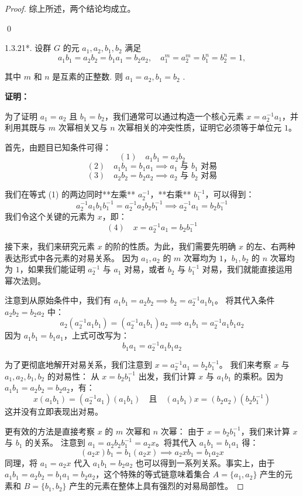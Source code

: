 \documentclass[]{article}
\begin{document}
\begin{proof}
\bigskip
综上所述，两个结论均成立。

\qed

1.3.21*. 设群 $G$ 的元 $a_1, a_2, b_1, b_2$ 满足 $$
a _ {1} b _ {1} = a _ {2} b _ {2} = b _ {1} a _ {1} = b _ {2} a _ {2}, \quad a _ {1} ^ {m} = a _ {2} ^ {m} = b _ {1} ^ {n} = b _ {2} ^ {n} = 1,
$$

其中 $m$ 和 $n$ 是互素的正整数. 则 $a_1 = a_2, b_1 = b_2$ . 

\bigskip
\noindent \textbf{证明：} 

为了证明 $a_1 = a_2$ 且 $b_1 = b_2$，我们通常可以通过构造一个核心元素 $x = a_2^{-1}a_1$，并利用其既与 $m$ 次幂相关又与 $n$ 次幂相关的冲突性质，证明它必须等于单位元 $1$。

首先，由题目已知条件可得：
\[ (1) \quad a_{1} b_{1} = a_{2} b_{2} \]
\[ (2) \quad a_{1} b_{1} = b_{1} a_{1} \implies a_1 \text{ 与 } b_1 \text{ 对易} \]
\[ (3) \quad a_{2} b_{2} = b_{2} a_{2} \implies a_2 \text{ 与 } b_2 \text{ 对易} \]

我们在等式 (1) 的两边同时**左乘** $a_2^{-1}$，**右乘** $b_1^{-1}$，可以得到：
\[ a_2^{-1} a_1 b_1 b_1^{-1} = a_2^{-1} a_2 b_2 b_1^{-1} \implies a_2^{-1} a_1 = b_2 b_1^{-1} \]
我们令这个关键的元素为 $x$，即：
\[ (4) \quad x = a_2^{-1} a_1 = b_2 b_1^{-1} \]

接下来，我们来研究元素 $x$ 的阶的性质。为此，我们需要先明确 $x$ 的左、右两种表达形式中各元素的对易关系。
因为 $a_1, a_2$ 的 $m$ 次幂均为 $1$，$b_1, b_2$ 的 $n$ 次幂均为 $1$，如果我们能证明 $a_2^{-1}$ 与 $a_1$ 对易，或者 $b_2$ 与 $b_1^{-1}$ 对易，我们就能直接运用幂次法则。

注意到从原始条件中，我们有 $a_1 b_1 = a_2 b_2 \implies b_2 = a_2^{-1} a_1 b_1$。
将其代入条件 $a_2 b_2 = b_2 a_2$ 中：
\[ a_2 (a_2^{-1} a_1 b_1) = (a_2^{-1} a_1 b_1) a_2 \implies a_1 b_1 = a_2^{-1} a_1 b_1 a_2 \]
因为 $a_1 b_1 = b_1 a_1$，上式可改写为：
\[ b_1 a_1 = a_2^{-1} a_1 b_1 a_2 \]

为了更彻底地解开对易关系，我们注意到 $x = a_2^{-1}a_1 = b_2 b_1^{-1}$。
我们来考察 $x$ 与 $a_1, a_2, b_1, b_2$ 的对易性：
从 $x = b_2 b_1^{-1}$ 出发，我们计算 $x$ 与 $a_1 b_1$ 的乘积。因为 $a_1 b_1 = a_2 b_2 = b_2 a_2$，有：
\[ x (a_1 b_1) = (a_2^{-1} a_1) (a_1 b_1) \quad \text{且} \quad (a_1 b_1) x = (b_2 a_2) (b_2 b_1^{-1}) \]
这并没有立即表现出对易。

更有效的方法是直接考察 $x$ 的 $m$ 次幂和 $n$ 次幂：
由于 $x = b_2 b_1^{-1}$，我们来计算 $x$ 与 $b_1$ 的关系。
注意到 $a_1 = a_2 b_2 b_1^{-1} = a_2 x$。将其代入 $a_1 b_1 = b_1 a_1$ 得：
\[ (a_2 x) b_1 = b_1 (a_2 x) \implies a_2 x b_1 = b_1 a_2 x \]
同理，将 $a_1 = a_2 x$ 代入 $a_1 b_1 = b_2 a_2$ 也可以得到一系列关系。事实上，由于 $a_1 b_1 = a_2 b_2 = b_1 a_1 = b_2 a_2$，这个特殊的等式链意味着集合 $A = \{a_1, a_2\}$ 产生的元素和 $B = \{b_1, b_2\}$ 产生的元素在整体上具有强烈的对易局部性。


\end{proof}
\end{document}
